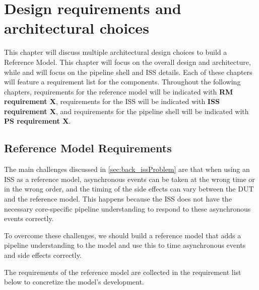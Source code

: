 \chapter{Design requirements and architectural choices}
\label{ch:design}


This chapter will discuss multiple architectural design choices to build a Reference Model. This chapter will focus on the overall design and architecture, while  and  will focus on the pipeline shell and ISS details. Each of these chapters will feature a requirement list for the components. Throughout the following chapters, requirements for the reference model will be indicated with \textbf{RM requirement X}, requirements for the ISS will be indicated with \textbf{ISS requirement X}, and requirements for the pipeline shell will be indicated with \textbf{PS requirement X}. 

\section{Reference Model Requirements}
\label{sec:rm_req}

The main challenges discussed in \cref{sec:back_issProblem} are that when using an ISS as a reference model, asynchronous events can be taken at the wrong time or in the wrong order, and the timing of the side effects can vary between the DUT and the reference model. This happens because the ISS does not have the necessary core-specific pipeline understanding to respond to these asynchronous events correctly.

To overcome these challenges, we should build a reference model that adds a pipeline understanding to the model and use this to time asynchronous events and side effects correctly.

The requirements of the reference model are collected in the requirement list below to concretize the model's development.


